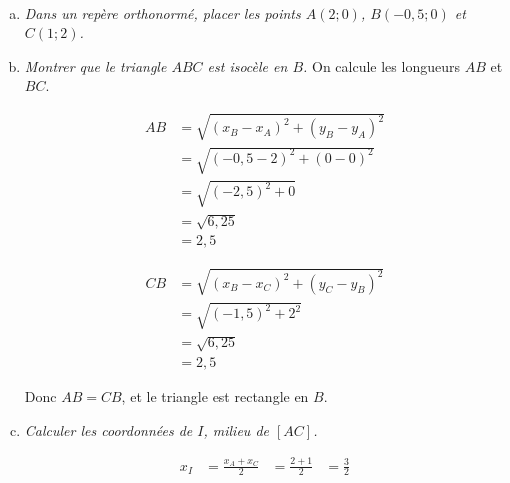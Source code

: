 \documentclass[12pt]{article}
\begin{document}
\begin{exercice}~
\begin{enumerate}[(a)]
  \item \emph{Dans un repère orthonormé, placer les points $A(2;0)$, $B(-0,5;0)$ et $C(1;2)$.}
    \begin{center}
    \end{center}
    
  \item \emph{Montrer que le triangle $ABC$ est isocèle en $B$.}
    On calcule les longueurs $AB$ et $BC$.

    \begin{multicols}{2}
    \begin{align*}
      AB&=\sqrt{\left( x_B-x_A \right)^2+\left( y_B-y_A \right)^2} \\
        &=\sqrt{\left( -0,5-2  \right)^2+\left( 0  -0   \right)^2} \\
        &=\sqrt{\left( -2,5 \right)^2+0}\\
        &=\sqrt{6,25}\\
        &=2,5
    \end{align*}

    \begin{align*}
      CB&=\sqrt{\left( x_B-x_C \right)^2+\left( y_C-y_B \right)^2} \\
        &=\sqrt{\left( -1,5 \right)^2+2^2}\\
        &=\sqrt{6,25}\\
        &=2,5
    \end{align*}
  \end{multicols}
  Donc $AB=CB$, et le triangle est rectangle en $B$.
  \item \emph{Calculer les coordonnées de $I$, milieu de $\left[AC\right]$.}
    \begin{multicols}{2}
    \begin{align*}
      x_I&=\frac{x_A+x_C}{2}
         &=\frac{2+1}{2}
         &=\frac{3}{2}
    \end{align*}


\end{multicols}
\end{enumerate}
\end{exercice}
\end{document}
